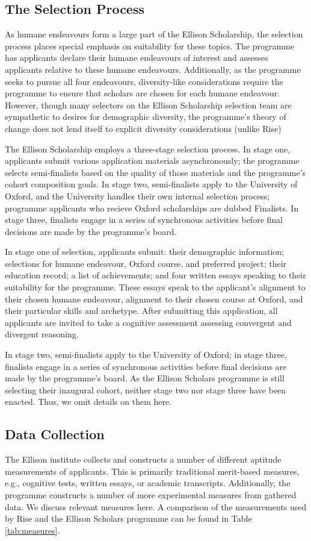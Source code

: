 \subsection{The Selection Process}
As humane endeavours form a large part of the Ellison Scholarship, the selection process places special emphasis on suitability for these topics. The programme has applicants declare their humane endeavours of interest and assesses applicants relative to these humane endeavours. Additionally, as the programme seeks to pursue all four endeavours, diversity-like considerations require the programme to ensure that scholars are chosen for each humane endeavour. However, though many selectors on the Ellison Scholarship selection team are sympathetic to desires for demographic diversity, the programme's theory of change does not lend itself to explicit diversity considerations (unlike Rise)

The Ellison Scholarship employs a three-stage selection process. In stage one, applicants submit various application materials asynchronously; the programme selects semi-finalists based on the quality of those materials and the programme's cohort composition goals. In stage two, semi-finalists apply to the University of Oxford, and the University handles their own internal selection process; programme applicants who recieve Oxford scholarships are dubbed Finalists. In stage three, finalists engage in a series of synchronous activities before final decisions are made by the programme's board. 

In stage one of selection, applicants submit: their demographic information; selections for humane endeavour, Oxford course, and preferred project; their education record; a list of achievements; and four written essays speaking to their suitability for the programme. These essays speak to the applicant's alignment to their chosen humane endeavour, alignment to their chosen course at Oxford, and their particular skills and archetype. After submitting this application, all applicants are invited to take a cognitive assessment assessing convergent and divergent reasoning.

In stage two, semi-finalists apply to the University of Oxford; in stage three, finalists engage in a series of synchronous activities before final decisions are made by the programme's board. As the Ellison Scholars programme is still selecting their inaugural cohort, neither stage two nor stage three have been enacted. Thus, we omit details on them here. 

\subsection{Data Collection}
The Ellison institute collects and constructs a number of different aptitude measurements of applicants. This is primarily traditional merit-based measures, e.g., cognitive tests, written essays, or academic transcripts. Additionally, the programme constructs a number of more experimental measures from gathered data. We discuss relevant measures here. A comparison of the measurements used by Rise and the Ellison Scholars programme can be found in Table \ref{tab:measures}.

